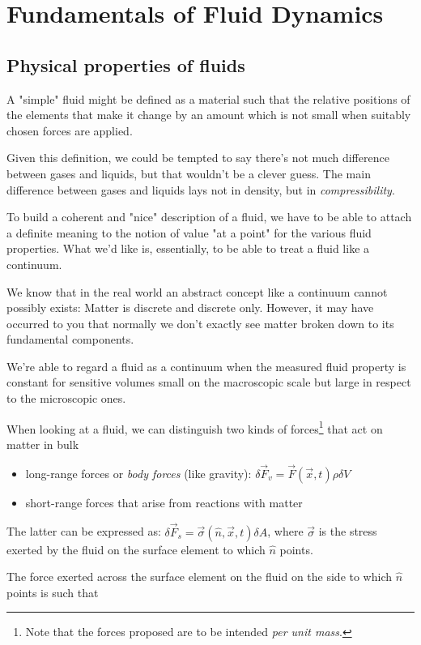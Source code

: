 \chapter{Fundamentals of Fluid Dynamics}\label{ch:iv}

\section{Physical properties of fluids}
A "simple" fluid might be defined as a material such that the relative positions of the elements that make it change by an amount which is not small when suitably chosen forces are applied. 
\par Given this definition, we could be tempted to say there's not much difference between gases and liquids, but that wouldn't be a clever guess. The main difference between gases and liquids lays not in density, but in \emph{compressibility}.
\par To build a coherent and "nice" description of a fluid, we have to be able to attach a definite meaning to the notion of value "at a point" for the various fluid properties. What we'd like is, essentially, to be able to treat a fluid like a continuum.
\par We know that in the real world an abstract concept like a continuum cannot possibly exists: Matter is discrete and discrete only. However, it may have occurred to you that normally we don't exactly see matter broken down to its fundamental components.
\par We're able to regard a fluid as a continuum when the measured fluid property is constant for sensitive volumes small on the macroscopic scale but large in respect to the microscopic ones.
\par When looking at a fluid, we can distinguish two kinds of forces\footnote{Note that the forces proposed are to be intended \emph{per unit mass}.} that act on matter in bulk
\begin{itemize}
    \item long-range forces or \emph{body forces} (like gravity): $\delta\vec{F}_{v} = \vec{F}(\vec{x}, t)\rho\delta V$
    \item short-range forces that arise from reactions with matter
\end{itemize}
The latter can be expressed as: $\delta\vec{F}_{s} = \vec{\sigma}(\hat{n}, \vec{x}, t)\delta A$, where $\vec{\sigma}$ is the stress exerted by the fluid on the surface element to which $\hat{n}$ points.
\par The force exerted across the surface element on the fluid on the side to which $\hat{n}$ points is such that 
